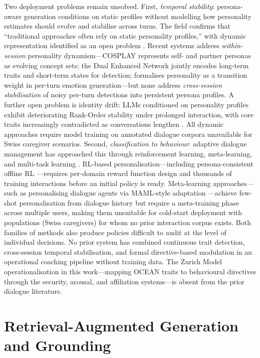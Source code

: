 \documentclass[10pt,a4paper]{report}
\begin{document}
Two deployment problems remain unsolved. First, \emph{temporal stability}: persona-aware generation conditions on static profiles \citep{Li2016, Majumder2020} without modelling how personality estimates should evolve and stabilise across turns. The field confirms that ``traditional approaches often rely on static personality profiles,'' with dynamic representation identified as an open problem \citep{Zheng2019}. Recent systems address \emph{within-session} personality dynamism---COSPLAY \citep{Xu2022} represents self- and partner personas as evolving concept sets; the Dual Enhanced Network \citep{Zhu2024} jointly encodes long-term traits and short-term states for detection; \citet{Wen2024b} formalises personality as a transition weight in per-turn emotion generation---but none address \emph{cross-session stabilisation} of noisy per-turn detections into persistent persona profiles. A further open problem is identity drift: LLMs conditioned on personality profiles exhibit deteriorating Rank-Order stability under prolonged interaction, with core traits increasingly contradicted as conversations lengthen \citep{Kovac2024}. All dynamic approaches require model training on annotated dialogue corpora unavailable for Swiss caregiver scenarios. Second, \emph{classification to behaviour}: adaptive dialogue management has approached this through reinforcement learning, meta-learning, and multi-task learning \citep{denHengst2019, Lee2021, Cordier2023}. RL-based personalisation---including persona-consistent offline RL \citep{Shea2023}---requires per-domain reward function design and thousands of training interactions before an initial policy is ready. Meta-learning approaches---such as personalising dialogue agents via MAML-style adaptation \citep{Lin2019}---achieve few-shot personalisation from dialogue history but require a meta-training phase across multiple users, making them unsuitable for cold-start deployment with populations (Swiss caregivers) for whom no prior interaction corpus exists. Both families of methods also produce policies difficult to audit at the level of individual decisions. No prior system has combined continuous trait detection, cross-session temporal stabilisation, and formal directive-based modulation in an operational coaching pipeline without training data. The Zurich Model operationalisation in this work---mapping OCEAN traits to behavioural directives through the security, arousal, and affiliation systems---is absent from the prior dialogue literature.

\section{Retrieval-Augmented Generation and Grounding}
\end{document}
